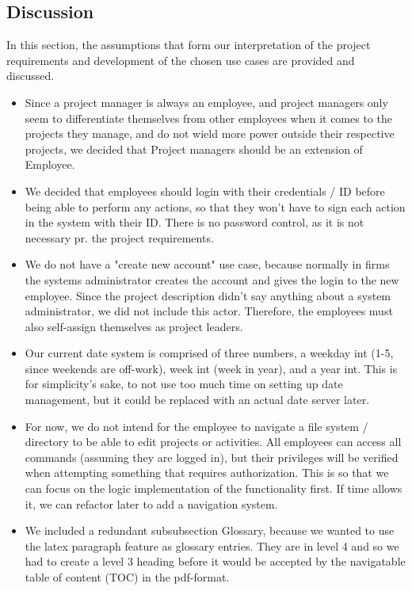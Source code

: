 

\subsection{Discussion}
\noindent In this section, the assumptions that form our interpretation of the project requirements and development of the chosen use cases are provided and discussed.

\begin{itemize}
    \item Since a project manager is always an employee, and project managers only seem to differentiate themselves from other employees when it comes to the projects they manage, and do not wield more power outside their respective projects, we decided that Project managers should be an extension of Employee.
    \item We decided that employees should login with their credentials / ID before being able to perform any actions, so that they won't have to sign each action in the system with their ID. There is no password control, as it is not necessary pr. the project requirements.
    \item We do not have a "create new account" use case, because normally in firms the systems administrator creates the account and gives the login to the new employee. Since the project description didn't say anything about a system administrator, we did not include this actor. Therefore, the employees must also self-assign themselves as project leaders.
    \item Our current date system is comprised of three numbers, a weekday int (1-5, since weekends are off-work), week int (week in year), and a year int. This is for simplicity's sake, to not use too much time on setting up date management, but it could be replaced with an actual date server later.
    \item For now, we do not intend for the employee to navigate a file system / directory to be able to edit projects or activities. All employees can access all commands (assuming they are logged in), but their privileges will be verified when attempting something that requires authorization. This is so that we can focus on the logic implementation of the functionality first. If time allows it, we can refactor later to add a navigation system.
    \item We included a redundant subsubsection Glossary, because we wanted to use the latex paragraph feature as glossary entries. They are in level 4 and so we had to create a level 3 heading before it would be accepted by the navigatable table of content (TOC) in the pdf-format. 
\end{itemize}





